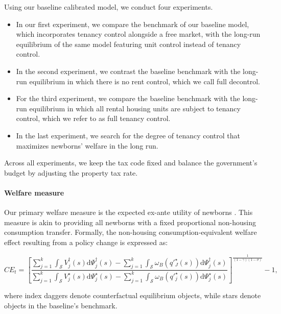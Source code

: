 \documentclass[parskip=full]{article}
\begin{document}
Using our baseline calibrated model, we conduct four experiments.

\begin{itemize}
    \item In our first experiment, we compare the benchmark of our baseline model, which incorporates tenancy control alongside a free market, with the long-run equilibrium of the same model featuring unit control instead of tenancy control.
    \item In the second experiment, we contrast the baseline benchmark with the long-run equilibrium in which there is no rent control, which we call full decontrol.
    \item For the third experiment, we compare the baseline benchmark with the long-run equilibrium in which all rental housing units are subject to tenancy control, which we refer to as full tenancy control.
    \item In the last experiment, we search for the degree of tenancy control that maximizes newborns' welfare in the long run.
\end{itemize}

Across all experiments, we keep the tax code fixed and balance the government's budget by adjusting the property tax rate.

\paragraph{Welfare measure} Our primary welfare measure is the expected ex-ante utility of newborns \citep{ralws-1971,conesa-et-al,gkkoc}. This measure is akin to providing all newborns with a fixed proportional non-housing consumption transfer. Formally, the non-housing consumption-equivalent welfare effect resulting from a policy change is expressed as:

\begin{equation}
  CE_{t} = \left[\frac{\sum_{j=1}^{k}\int_{\mathcal{S}}V^{\dagger}_{j}(s)\mathrm{d}\Psi^{\dagger}_{j}(s)-\sum_{j=1}^{k}\int_{\mathcal{S}}\omega_{B}(q'^{\star}_{J}(s))\mathrm{d}\Psi^{\dagger}_{j}(s)}{\sum_{j=1}^{k}\int_{\mathcal{S}}V^{\star}_{j}(s)\mathrm{d}\Psi^{\star}_{j}(s)-\sum_{j=1}^{k}\int_{\mathcal{S}}\omega_{B}(q'^{\star}_{j}(s))\mathrm{d}\Psi^{\star}_{j}(s)}\right]^{\frac{1}{(1-\gamma)(1-\sigma)}}-1,
\end{equation}

\noindent where index daggers denote counterfactual equilibrium objects, while stars denote objects in the baseline's benchmark. 
\end{document}
